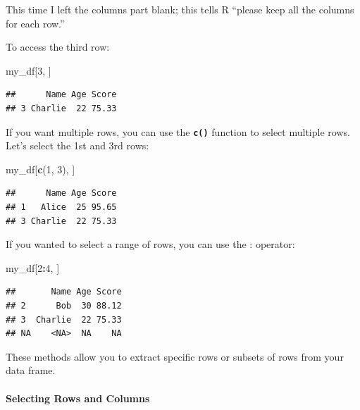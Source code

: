 \documentclass[
]{book}
\newenvironment{Shaded}{\begin{snugshade}}{\end{snugshade}}
\newcommand{\DecValTok}[1]{\textcolor[rgb]{0.00,0.00,0.81}{#1}}
\newcommand{\FunctionTok}[1]{\textcolor[rgb]{0.13,0.29,0.53}{\textbf{#1}}}
\newcommand{\NormalTok}[1]{#1}
\newcommand{\SpecialCharTok}[1]{\textcolor[rgb]{0.81,0.36,0.00}{\textbf{#1}}}
\begin{document}
This time I left the columns part blank; this tells R ``please keep all the columns for each row.''

To access the third row:

\begin{Shaded}
\begin{Highlighting}[]
\NormalTok{my\_df[}\DecValTok{3}\NormalTok{, ]}
\end{Highlighting}
\end{Shaded}

\begin{verbatim}
##      Name Age Score
## 3 Charlie  22 75.33
\end{verbatim}

If you want multiple rows, you can use the \textbf{\texttt{c()}} function to select multiple rows. Let's select the 1st and 3rd rows:

\begin{Shaded}
\begin{Highlighting}[]
\NormalTok{my\_df[}\FunctionTok{c}\NormalTok{(}\DecValTok{1}\NormalTok{, }\DecValTok{3}\NormalTok{), ]}
\end{Highlighting}
\end{Shaded}

\begin{verbatim}
##      Name Age Score
## 1   Alice  25 95.65
## 3 Charlie  22 75.33
\end{verbatim}

If you wanted to select a range of rows, you can use the : operator:

\begin{Shaded}
\begin{Highlighting}[]
\NormalTok{my\_df[}\DecValTok{2}\SpecialCharTok{:}\DecValTok{4}\NormalTok{, ]}
\end{Highlighting}
\end{Shaded}

\begin{verbatim}
##       Name Age Score
## 2      Bob  30 88.12
## 3  Charlie  22 75.33
## NA    <NA>  NA    NA
\end{verbatim}

These methods allow you to extract specific rows or subsets of rows from your data frame.

\hypertarget{selecting-rows-and-columns}{%
\paragraph{Selecting Rows and Columns}\label{selecting-rows-and-columns}}
\end{document}
